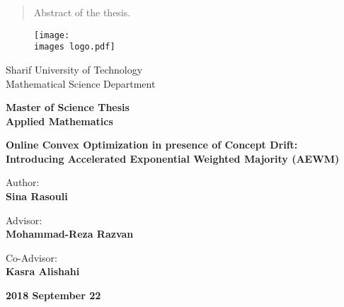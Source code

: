 \documentclass[a4paper,11px]{article}
\begin{document}
\newpage



\begin{latin}
\begin{abstract}
Abstract of the thesis.
\end{abstract}
\end{latin}
\newpage



\thispagestyle{empty}
\begin{latin}

\begin{figure}[!hbt]
\centering
\texttt{[image: \\images logo.pdf]}
\centering
\end{figure}

\vspace{-5mm}
\begin{center}
\large
Sharif University of Technology\\
Mathematical Science Department
\end{center}

\vspace{5mm}
\begin{center}
\large
\textbf{
Master of Science Thesis\\
Applied Mathematics
}
\end{center}


\vspace{5mm}
\begin{center}
\Large
\textbf{
Online Convex Optimization in presence of Concept Drift:\\
Introducing Accelerated Exponential Weighted Majority (AEWM)
}
\end{center}


\vspace{10mm}
\begin{center}
\large
Author:
\\
\textbf{
Sina Rasouli
}
\end{center}



\vspace{10mm}
\begin{center}
\large
Advisor:
\\
\textbf{
Mohammad-Reza Razvan
}
\end{center}

\vspace{2mm}

\begin{center}
\large
Co-Advisor:
\\
\textbf{
Kasra Alishahi
}
\end{center}



\vfill
\begin{center}
\large \textbf{
2018 September 22
}
\end{center}

\end{latin}


\newpage
\end{document}
